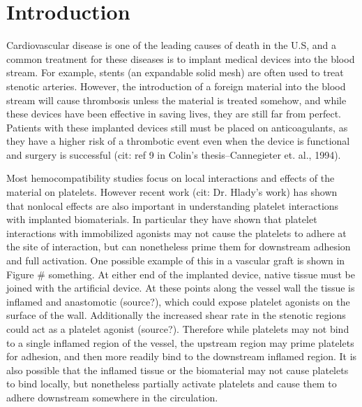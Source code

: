 
\chapter{Introduction}
\label{cha:introduction}





Cardiovascular disease is one of the leading causes of death in the
U.S, and a common treatment for these diseases is to implant medical
devices into the blood stream. For example, stents (an expandable
solid mesh) are often used to treat stenotic arteries. However, the
introduction of a foreign material into the blood stream will cause
thrombosis unless the material is treated somehow, and while these
devices have been effective in saving lives, they are still far from
perfect. Patients with these implanted devices still must be placed on
anticoagulants, as they have a higher risk of a thrombotic event even
when the device is functional and surgery is successful (cit: ref 9 in
Colin's thesis--Cannegieter et. al., 1994).
		

Most hemocompatibility studies focus on local interactions and effects
of the material on platelets. However recent work (cit: Dr. Hlady's
work) has shown that nonlocal effects are also important in
understanding platelet interactions with implanted biomaterials. In
particular they have shown that platelet interactions with immobilized
agonists may not cause the platelets to adhere at the site of
interaction, but can nonetheless prime them for downstream adhesion
and full activation. One possible example of this in a vascular graft
is shown in Figure \# something. At either end of the implanted
device, native tissue must be joined with the artificial device. At
these points along the vessel wall the tissue is inflamed and
anastomotic (source?), which could expose platelet agonists on the
surface of the wall. Additionally the increased shear rate in the
stenotic regions could act as a platelet agonist (source?). Therefore
while platelets may not bind to a single inflamed region of the
vessel, the upstream region may prime platelets for adhesion, and then
more readily bind to the downstream inflamed region. It is also
possible that the inflamed tissue or the biomaterial may not cause
platelets to bind locally, but nonetheless partially activate
platelets and cause them to adhere downstream somewhere in the
circulation.
		
